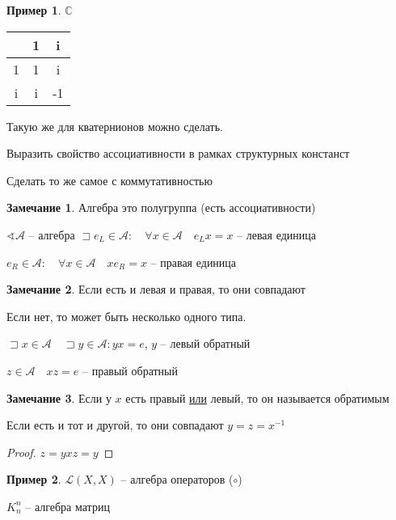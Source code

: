 \documentclass{book}
\renewcommand\C{\ensuremath{\mathbb{C}}}
\theoremstyle{definition}
\newtheorem*{note}{Замечание}
\newtheorem*{example}{Пример}
\begin{document}
\begin{example}
    $\C$

    \begin{tabular}{|c|c|c|}       
    \hline &1&i\\ \hline
    1 & 1 & i\\ \hline
i&i&-1\\ \hline
    \end{tabular}

    Такую же для кватернионов можно сделать. 
\end{example}

\begin{problem}
    Выразить свойство ассоциативности в рамках структурных констанст

    Сделать то же самое с коммутативностью
\end{problem}

\begin{note}
    Алгебра это полугруппа (есть ассоциативности)
\end{note}

$\sphericalangle \mathscr{A}$ -- алгебра $\sqsupset e_L\in \mathscr{A}:\quad \forall x\in \mathscr{A}\quad e_L x = x$ -- левая единица

$e_R\in\mathscr{A}:\quad \forall x\in \mathscr{A}\quad xe_R = x$ -- правая единица

\begin{note}
    Если есть и левая и правая, то они совпадают

    Если нет, то может быть несколько одного типа.
\end{note}

$\sqsupset x\in \mathscr{A}\quad \sqsupset y\in \mathscr{A}: yx = e$, $y$ -- левый обратный

$z\in\mathscr{A}\quad xz = e$ -- правый обратный

 \begin{note}
     Если у $x$ есть правый \underline{или} левый, то он называется обратимым

     Если есть и тот и другой, то они совпадают $y = z = x^{-1}$
      \begin{proof}
         $z = yxz = y$
     \end{proof}
\end{note}

\begin{example}
    $\mathcal{L}(X,X)$ -- алгебра операторов ($\circ$)

    $K_n^n$ -- алгебра матриц
\end{example}
\end{document}
